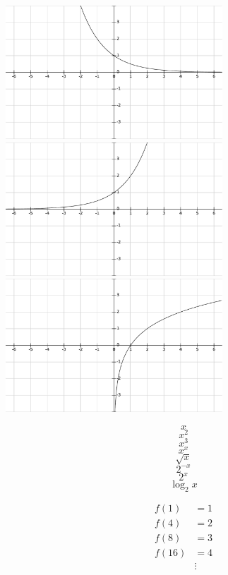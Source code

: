 \documentclass[12pt,a4paper]{article}
\begin{document}
\vspace{1em}
\hspace{1em}
\includegraphics[height=5cm]{2^-x.pdf}
\vspace{1em}
\includegraphics[height=5cm]{2^x.pdf}
\vspace{1em}
\hspace{1em}
\includegraphics[height=5cm]{log_2x.pdf}

\newpage

\large

\[ x \]
\[ x^2 \]
\[ x^3 \]
\[ x^x \]
\[ \sqrt{x} \]
\[ 2^{-x} \]
\[ 2^x \]
\[ \log_2{x} \]

\begin{align*}
	f(1) &= 1 \\
	f(4) &= 2 \\
	f(8) &= 3 \\
	f(16) &= 4 \\
	&\vdots
\end{align*}
\end{document}
